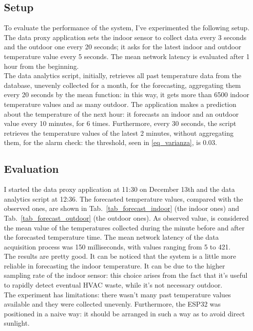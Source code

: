 \documentclass[conference]{IEEEtran}
\begin{document}
\subsection{Setup}
To evaluate the performance of the system, I've experimented the following setup.\\
The data proxy application sets the indoor sensor to collect data every 3 seconds and the outdoor one every 20 seconds; it asks for the latest indoor and outdoor temperature value every 5 seconds. The mean network latency is evaluated after 1 hour from the beginning.\\
The data analytics script, initially, retrieves all past temperature data from the database, unevenly collected for a month, for the forecasting, aggregating them every 20 seconds by the mean function: in this way, it gets more than 6500 indoor temperature values and as many outdoor. The application makes a prediction about the temperature of the next hour: it forecasts an indoor and an outdoor value every 10 minutes, for 6 times. Furthermore, every 30 seconds, the script retrieves the temperature values of the latest 2 minutes, without aggregating them, for the alarm check: the threshold, seen in \eqref{eq_varianza}, is $0.03$.

\subsection{Evaluation}
I started the data proxy application at 11:30 on December 13th and the data analytics script at 12:36. The forecasted temperature values, compared with the observed ones, are shown in Tab.~\ref{tab_forecast_indoor} (the indoor ones) and Tab.~\ref{tab_forecast_outdoor} (the outdoor ones). As observed value, is considered the mean value  of the temperatures collected during the minute before and after the forecasted temperature time. The mean network latency of the data acquisition process was 150 milliseconds, with values ranging from 5 to 421.\\
The results are pretty good. It can be noticed that the system is a little more reliable in forecasting the indoor temperature. It can be due to the higher sampling rate of the indoor sensor: this choice arises from the fact that it's useful to rapidly detect eventual HVAC waste, while it's not necessary outdoor.\\
The experiment has limitations: there wasn't many past temperature values available and they were collected unevenly. Furthermore, the ESP32 was positioned in a naive way: it should be arranged in such a way as to avoid direct sunlight.
\end{document}
